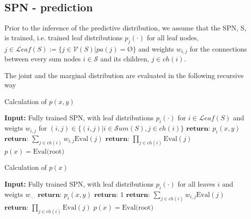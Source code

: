 \subsection{SPN - prediction}
Prior to the inference of the predictive distribution, we assume that the SPN, S, is trained, i.e.
trained leaf distributions $p_j(\cdot)$ for all leaf nodes, 
$j \in \mathcal{L}eaf(S):=\{j \in \mathcal{V}(S) |pa(j) = \text{Ø}\}$ and
weights $w_{i,j}$ for the connections between every sum nodes
$i \in \mathcal{S}$ and its children, $j \in ch(i)$.  

The joint and the marginal distribution are evaluated in the following recursive way
\begin{algorithm}
    \caption*{Calculation of $p(x,y)$}\label{SPN_1}
    \begin{algorithmic}
    \State \textbf{Input:} Fully trained SPN, with leaf distributions $p_i(\cdot)$ for $i\in \mathcal{L}eaf(S)$ and weigts 
    $w_{i,j}$ for $(i,j) \in \{(i,j)|i \in \mathcal{S}um(S), j \in ch(i)\}$ 
        \State  $\textbf{return: } p_i(x,y)$ 
    \EndIf
        \State $\textbf{return: } \sum_{j\in ch(i)} w_{i,j} \text{Eval}(j)$
    \EndIf
        \State $\textbf{return: } \prod_{j \in ch(i)} \text{Eval}(j)$
    \EndIf
    \EndFunction
    \State $p(x) =  \text{Eval(root)}$
    \end{algorithmic}
\end{algorithm}

\begin{algorithm}[H]
    \caption*{Calculation of $p(x)$}\label{SPN}
    \begin{algorithmic}
    \State \textbf{Input:} Fully trained SPN, with leaf distributions $p_i(\cdot)$ for all leaves $i$ and weigts $w_{\cdot,\cdot}$ 
            \State  $\textbf{return: } p_i(x,y)$ 
        \Else 
            \State  $\textbf{return: } 1$ 
        \EndIf
    \EndIf
        \State $\textbf{return: } \sum_{j\in ch(i)} w_{i,j} \text{Eval}(j)$
    \EndIf
        \State $\textbf{return: } \prod_{j \in ch(i)} \text{Eval}(j)$
    \EndIf
    \EndFunction
    \State $p(x) =  \text{Eval(root)}$
    \end{algorithmic}
\end{algorithm}

